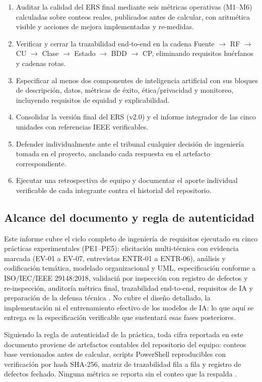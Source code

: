 \begin{enumerate}[leftmargin=0.9cm]
  \item Auditar la calidad del ERS final mediante seis m\'etricas operativas (M1--M6) calculadas sobre conteos reales, publicados antes de calcular, con aritm\'etica visible y acciones de mejora implementadas y re-medidas.
  \item Verificar y cerrar la trazabilidad end-to-end en la cadena Fuente $\rightarrow$ RF $\rightarrow$ CU $\rightarrow$ Clase $\rightarrow$ Estado $\rightarrow$ BDD $\rightarrow$ CP, eliminando requisitos hu\'erfanos y cadenas rotas.
  \item Especificar al menos dos componentes de inteligencia artificial con sus bloques de descripci\'on, datos, m\'etricas de \'exito, \'etica/privacidad y monitoreo, incluyendo requisitos de equidad y explicabilidad.
  \item Consolidar la versi\'on final del ERS (v2.0) y el informe integrador de las cinco unidades con referencias IEEE verificables.
  \item Defender individualmente ante el tribunal cualquier decisi\'on de ingenier\'ia tomada en el proyecto, anclando cada respuesta en el artefacto correspondiente.
  \item Ejecutar una retrospectiva de equipo y documentar el aporte individual verificable de cada integrante contra el historial del repositorio.
\end{enumerate}

\subsection{Alcance del documento y regla de autenticidad}

Este informe cubre el ciclo completo de ingenier\'ia de requisitos ejecutado en cinco pr\'acticas experimentales (PE1--PE5): elicitaci\'on multi-t\'ecnica con evidencia marcada (EV-01 a EV-07, entrevistas ENTR-01 a ENTR-06), an\'alisis y codificaci\'on tem\'atica, modelado organizacional y UML, especificaci\'on conforme a ISO/IEC/IEEE 29148:2018, validaci\'n por inspecci\'on con registro de defectos y re-inspecci\'on, auditor\'ia m\'etrica final, trazabilidad end-to-end, requisitos de IA y preparaci\'on de la defensa t\'ecnica \cite{iso29148}. No cubre el dise\~no detallado, la implementaci\'on ni el entrenamiento efectivo de los modelos de IA: lo que aqu\'i se entrega es la especificaci\'on verificable que sustentar\'a esas fases posteriores.

Siguiendo la regla de autenticidad de la pr\'actica, toda cifra reportada en este documento proviene de artefactos contables del repositorio del equipo: conteos base versionados antes de calcular, scripts PowerShell reproducibles con verificación por hash SHA-256, matriz de trazabilidad fila a fila y registro de defectos fechado. Ninguna m\'etrica se reporta sin el conteo que la respalda \cite{wohlin2012}.

